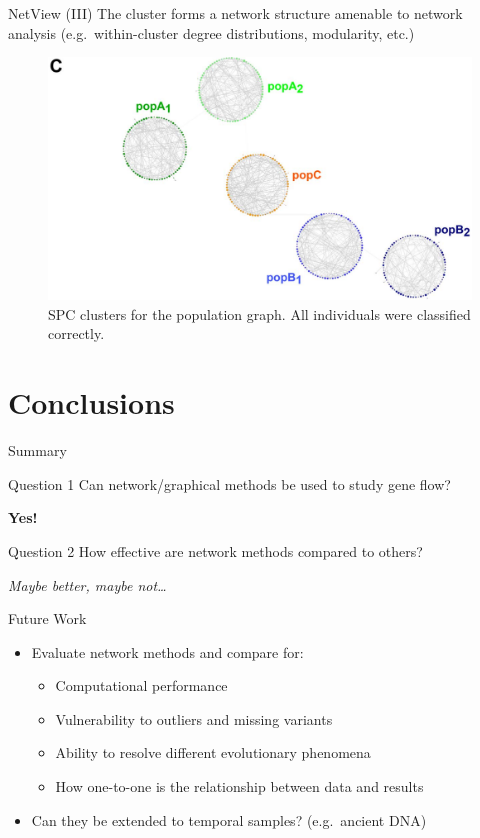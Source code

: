 \documentclass{beamer}
\begin{document}
\begin{frame}{NetView (III)}
  The cluster forms a network structure amenable to network analysis (e.g.\
  within-cluster degree distributions, modularity, etc.)
  \begin{figure}
    \includegraphics[width=1\linewidth,keepaspectratio]{../Figures/fig6c.png}
    \caption{SPC clusters for the population graph. All individuals were
    classified correctly.}
  \end{figure}
\end{frame}

\section{Conclusions}

\begin{frame}{Summary}
  \begin{block}{Question 1}
    Can network/graphical methods be used to study gene flow?
  \end{block}

  \textbf{Yes!}
  \vspace{1em}

  \begin{block}{Question 2}
    How effective are network methods compared to others?
  \end{block}

  \textit{Maybe better, maybe not\ldots}
\end{frame}

\begin{frame}{Future Work}
  \begin{itemize}
    \item Evaluate network methods and compare for:
      \begin{itemize}
        \item Computational performance
        \item Vulnerability to outliers and missing variants
        \item Ability to resolve different evolutionary phenomena
        \item How one-to-one is the relationship between data and results
      \end{itemize}
    \item Can they be extended to temporal samples? (e.g.~ancient DNA)
  \end{itemize}
\end{frame}
\end{document}
